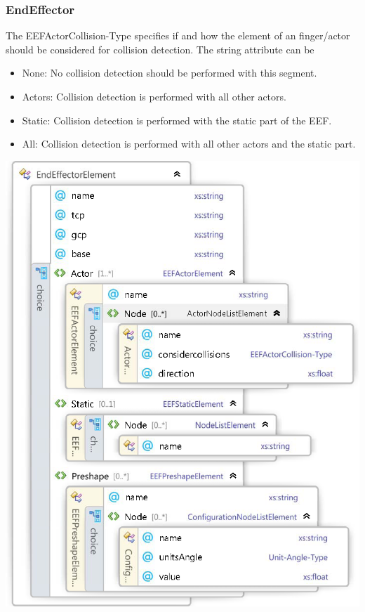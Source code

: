 \subsubsection*{EndEffector}
The EEFActorCollision-Type specifies if and how the element of an finger/actor should be considered for collision detection. The string attribute can be 
\begin{itemize}
\item None: No collision detection should be performed with this segment. 
\item Actors: Collision detection is performed with all other actors. 
\item Static: Collision detection is performed with the static part of the EEF. 
\item All: Collision detection is performed with all other actors and the static part. 
\end{itemize}
\includegraphics[width=\textwidth]{Xsd_EEF_open} 
